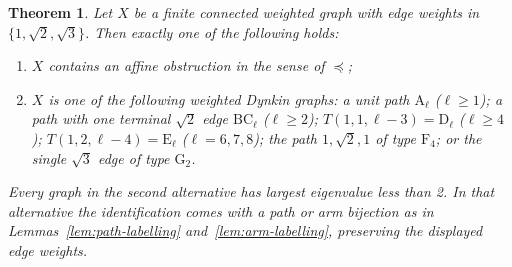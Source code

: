 \documentclass[11pt]{amsart}
\newtheorem{theorem}{Theorem}[section]
\theoremstyle{definition}
\newcommand{\typ}[1]{\mathrm{#1}}
\begin{document}
\begin{theorem}\label{thm:dichotomy}
Let $X$ be a finite connected weighted graph with edge weights in
$\{1,\sqrt2,\sqrt3\}$. Then exactly one of the following holds:
\begin{enumerate}
\item $X$ contains an affine obstruction in the sense of $\preccurlyeq$;
\item $X$ is one of the following weighted Dynkin graphs: a unit path
 $\typ A_\ell$ ($\ell\geq1$); a path with one terminal $\sqrt2$ edge
 $\typ{BC}_\ell$ ($\ell\geq2$); $T(1,1,\ell-3)=\typ D_\ell$
 ($\ell\geq4$); $T(1,2,\ell-4)=\typ E_\ell$ ($\ell=6,7,8$);
 the path $1,\sqrt2,1$ of type $\typ F_4$; or the single $\sqrt3$
 edge of type $\typ G_2$.
\end{enumerate}
Every graph in the second alternative has largest eigenvalue less than 2.
In that alternative the identification comes with a path or arm bijection
as in Lemmas~\ref{lem:path-labelling} and~\ref{lem:arm-labelling},
preserving the displayed edge weights.
\end{theorem}
\end{document}
